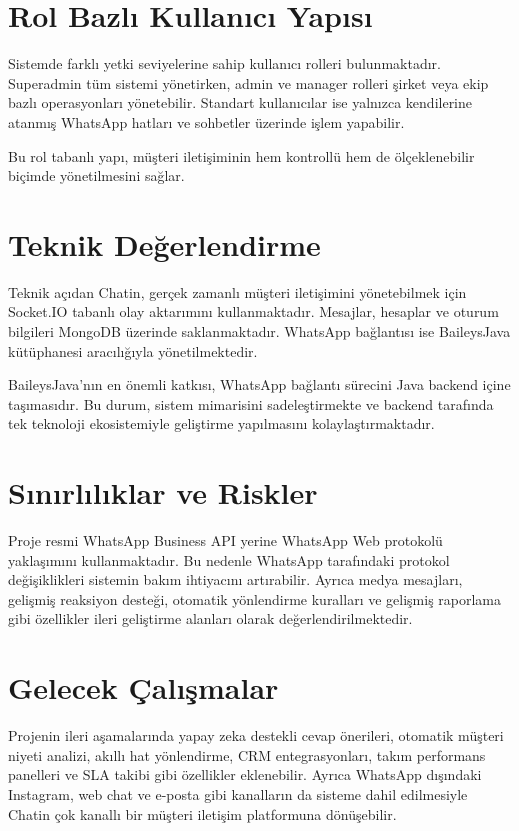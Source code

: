 \documentclass[12pt,a4paper]{article}
\begin{document}
\section{Rol Bazlı Kullanıcı Yapısı}

Sistemde farklı yetki seviyelerine sahip kullanıcı rolleri bulunmaktadır. Superadmin tüm sistemi yönetirken, admin ve manager rolleri şirket veya ekip bazlı operasyonları yönetebilir. Standart kullanıcılar ise yalnızca kendilerine atanmış WhatsApp hatları ve sohbetler üzerinde işlem yapabilir.

Bu rol tabanlı yapı, müşteri iletişiminin hem kontrollü hem de ölçeklenebilir biçimde yönetilmesini sağlar.

\section{Teknik Değerlendirme}

Teknik açıdan Chatin, gerçek zamanlı müşteri iletişimini yönetebilmek için Socket.IO tabanlı olay aktarımını kullanmaktadır. Mesajlar, hesaplar ve oturum bilgileri MongoDB üzerinde saklanmaktadır. WhatsApp bağlantısı ise BaileysJava kütüphanesi aracılığıyla yönetilmektedir.

BaileysJava'nın en önemli katkısı, WhatsApp bağlantı sürecini Java backend içine taşımasıdır. Bu durum, sistem mimarisini sadeleştirmekte ve backend tarafında tek teknoloji ekosistemiyle geliştirme yapılmasını kolaylaştırmaktadır.

\section{Sınırlılıklar ve Riskler}

Proje resmi WhatsApp Business API yerine WhatsApp Web protokolü yaklaşımını kullanmaktadır. Bu nedenle WhatsApp tarafındaki protokol değişiklikleri sistemin bakım ihtiyacını artırabilir. Ayrıca medya mesajları, gelişmiş reaksiyon desteği, otomatik yönlendirme kuralları ve gelişmiş raporlama gibi özellikler ileri geliştirme alanları olarak değerlendirilmektedir.

\section{Gelecek Çalışmalar}

Projenin ileri aşamalarında yapay zeka destekli cevap önerileri, otomatik müşteri niyeti analizi, akıllı hat yönlendirme, CRM entegrasyonları, takım performans panelleri ve SLA takibi gibi özellikler eklenebilir. Ayrıca WhatsApp dışındaki Instagram, web chat ve e-posta gibi kanalların da sisteme dahil edilmesiyle Chatin çok kanallı bir müşteri iletişim platformuna dönüşebilir.
\end{document}
